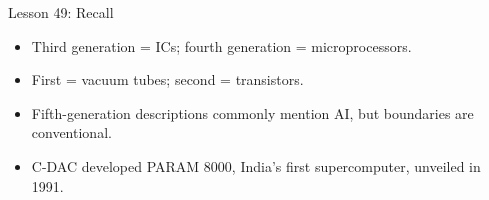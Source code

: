 \documentclass[aspectratio=169]{beamer}
\begin{document}
\begin{frame}{Lesson 49: Recall}
  \begin{itemize}
    \item Third generation = ICs; fourth generation = microprocessors.
    \item First = vacuum tubes; second = transistors.
    \item Fifth-generation descriptions commonly mention AI, but boundaries
      are conventional.
    \item C-DAC developed PARAM 8000, India's first supercomputer, unveiled
      in 1991.
  \end{itemize}
\end{frame}
\end{document}

